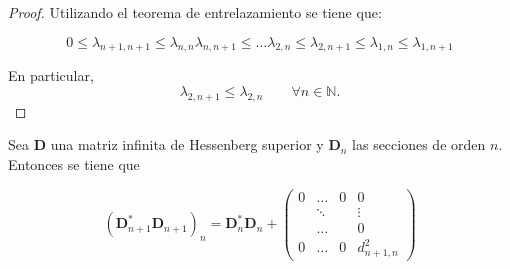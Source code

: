 \begin{proof} Utilizando el teorema de entrelazamiento se tiene que:

  $$
    0 \leq \lambda_{n+1,n+1} \leq \lambda_{n,n} \lambda_{n,n+1} \leq \dots \lambda_{2,n}  \leq \lambda_{2,n+1} \leq \lambda_{1,n} \leq \lambda_{1,n+1}
  $$

  \noindent En particular,
  $$
    \lambda_{2,n+1} \leq \lambda_{2,n} \qquad \forall n\in \mathbb{N}.
  $$
\end{proof}

\noindent

\begin{lemma} Sea $\mathbf{D}$ una matriz infinita de Hessenberg superior y $\mathbf{D}_n$ las secciones de orden $n$. Entonces se tiene que

  $$
    (\mathbf{D}_{n+1}^{*}\mathbf{D}_{n+1})_{n} = \mathbf{D}_n^{*}\mathbf{D}_n +\begin{pmatrix}
      0 & \dots  & 0 & 0           \\
        & \ddots &   & \vdots      \\
        & \dots  &   & 0           \\
      0 & \dots  & 0 & d_{n+1,n}^2
    \end{pmatrix}
  $$
\end{lemma}

